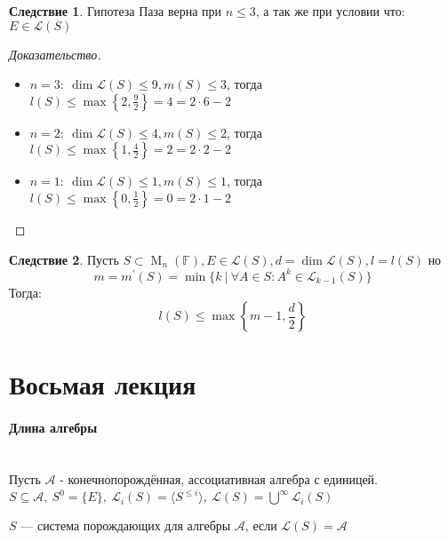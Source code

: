 \documentclass[a4paper, 14pt]{extarticle}
\theoremstyle{definition}
\newtheorem{conseq}{Следствие}
\begin{document}
\begin{conseq}
	Гипотеза Паза верна при \(n \leqslant 3\), а так же при условии что: \(E \in \mathcal{L}(S)\)
\end{conseq}

\begin{proof}[Доказательство]
	\leavevmode
	\begin{itemize}
		\item \(n = 3:\ \operatorname{dim} \mathcal{L}(S) \leqslant 9, m(S) \leqslant 3\), тогда \(l(S) \leqslant \operatorname{max} \left\{ 2, \frac{9}{2} \right\} = 4 = 2 \cdot 6 - 2\)
		
		\item \(n = 2:\ \operatorname{dim} \mathcal{L}(S) \leqslant 4, m(S) \leqslant 2\), тогда \(l(S) \leqslant \operatorname{max} \left\{ 1, \frac{4}{2} \right\} = 2 = 2 \cdot 2 - 2\)
		
		\item \(n = 1:\ \operatorname{dim} \mathcal{L}(S) \leqslant 1, m(S) \leqslant 1\), тогда \(l(S) \leqslant \operatorname{max} \left\{ 0, \frac{1}{2} \right\} = 0 = 2 \cdot 1 - 2\)
	\end{itemize}
\end{proof}

\begin{conseq}\label{cs7_2}
	Пусть \(S \subset \operatorname{M}_n(\mathbb{F}), E \in \mathcal{L}(S), d = \operatorname{dim} \mathcal{L}(S), l = l(S)\) но
	\[m = m^{\prime}(S) = \operatorname{min} \{k\ |\ \forall A \in S : A^k \in \mathcal{L}_{k - 1}(S)\}\]
	Тогда:
	\[l(S) \leqslant \operatorname{max} \left\{ m - 1, \frac{d}{2} \right\}\]
\end{conseq}

\newpage
\section{Восьмая лекция}

\paragraph{Длина алгебры}
~\\

Пусть \(\mathcal{A}\) - конечнопорождённая, ассоциативная алгебра с единицей. \(S \subseteq \mathcal{A},\ S^0 = \{E\},\ \mathcal{L}_i(S) = \langle S^{\leqslant i} \rangle,\ \mathcal{L}(S) = \bigcup\limits^{\infty} \mathcal{L}_i(S)\)

\(S\) --- система порождающих для алгебры \(\mathcal{A}\), если \(\mathcal{L}(S) = \mathcal{A}\)
\end{document}
